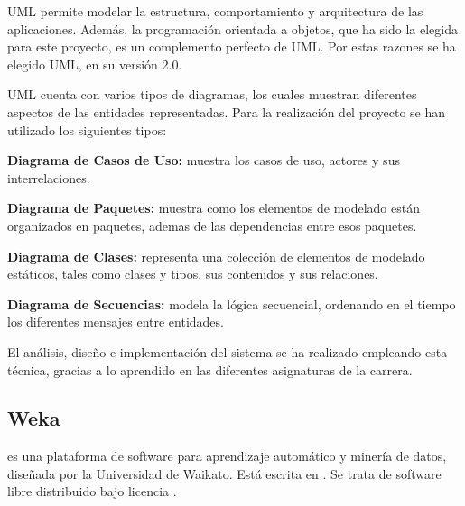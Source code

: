 UML permite modelar la estructura, comportamiento y arquitectura de las aplicaciones. Además, la programación orientada a objetos, que ha sido la elegida para este proyecto, es un complemento perfecto de UML. Por estas razones se ha elegido UML, en su versión 2.0.

UML cuenta con varios tipos de diagramas, los cuales muestran diferentes aspectos de las entidades
representadas. Para la realización del proyecto se han utilizado los siguientes tipos:

\begin{description}
\item \textbf{Diagrama de Casos de Uso:} muestra los casos de uso, actores y sus interrelaciones.
\item \textbf{Diagrama de Paquetes:} muestra como los elementos de modelado están organizados en
paquetes, ademas de las dependencias entre esos paquetes.
\item \textbf{Diagrama de Clases:} representa una colección de elementos de modelado estáticos, tales
como clases y tipos, sus contenidos y sus relaciones.
\item \textbf{Diagrama de Secuencias:} modela la lógica secuencial, ordenando en el tiempo los diferentes
mensajes entre entidades.
\end{description}

El análisis, diseño e implementación del sistema se ha realizado empleando esta técnica, gracias a lo aprendido en las diferentes asignaturas de la carrera.


\subsection{Weka}
\weka{} \cite{weka} es una plataforma de software para aprendizaje automático y minería de datos, diseñada por la Universidad de Waikato. Está escrita en \java{}. Se trata de software libre distribuido bajo licencia \gnu{}.

